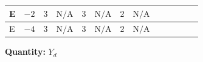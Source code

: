 \documentclass[8pt]{article}
\begin{document}
\begin{landscape}
\begin{longtable}{@{}llcccccc >{\raggedright\arraybackslash}p{0.21\linewidth} >{\raggedright\arraybackslash}p{0.21\linewidth} >{\raggedright\arraybackslash}p{0.21\linewidth}@{}}
E & $-2$ & $3$ & $\text{N/A}$ & $3$ & $\text{N/A}$ & $2$ & $\text{N/A}$ & \scriptsize\adjustbox{max width=\linewidth}{$\begin{gathered} +\frac{3}{2} (\left({Y_d}\,\left({Y_d}\right)^{\dagger}\,{Y_d}\right)_{ij}-\left({Y_u}\,\left({Y_u}\right)^{\dagger}\,{Y_d}\right)_{ij})\end{gathered}$} & \scriptsize\adjustbox{max width=\linewidth}{$\begin{gathered} -\frac{9}{4} {g_2}^2 \left({Y_d}\right)_{ij}\end{gathered}$} & \scriptsize\adjustbox{max width=\linewidth}{$\begin{gathered} -8 {g_3}^2 \left({Y_d}\right)_{ij}\end{gathered}$} \\
\midrule
E & $-4$ & $3$ & $\text{N/A}$ & $3$ & $\text{N/A}$ & $2$ & $\text{N/A}$ & \scriptsize\adjustbox{max width=\linewidth}{$\begin{gathered} +\frac{3}{2} (\left({Y_d}\,\left({Y_d}\right)^{\dagger}\,{Y_d}\right)_{ij}-\left({Y_u}\,\left({Y_u}\right)^{\dagger}\,{Y_d}\right)_{ij})\end{gathered}$} & \scriptsize\adjustbox{max width=\linewidth}{$\begin{gathered} -\frac{9}{4} {g_2}^2 \left({Y_d}\right)_{ij}\end{gathered}$} & \scriptsize\adjustbox{max width=\linewidth}{$\begin{gathered} -8 {g_3}^2 \left({Y_d}\right)_{ij}\end{gathered}$} \\
\midrule
\bottomrule
\end{longtable}
\clearpage
\noindent\textbf{Quantity: }$Y_d$\par\smallskip

\end{landscape}
\end{document}
